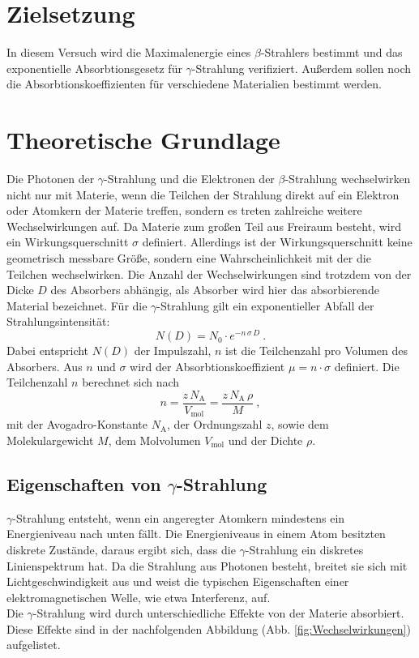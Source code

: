 \section{Zielsetzung}
\label{sec:Zielsetzung}
In diesem Versuch wird die Maximalenergie eines $\beta$-Strahlers bestimmt und das exponentielle Absorbtionsgesetz für $\gamma$-Strahlung verifiziert. Außerdem sollen noch die Absorbtionskoeffizienten für verschiedene Materialien bestimmt werden.

\section{Theoretische Grundlage}
\label{sec:Theorie}
Die Photonen der $\gamma$-Strahlung und die Elektronen der $\beta$-Strahlung wechselwirken nicht nur mit Materie, wenn die Teilchen der Strahlung direkt auf ein Elektron oder Atomkern der Materie treffen, sondern es treten zahlreiche weitere Wechselwirkungen auf. Da Materie zum großen Teil aus Freiraum besteht, wird ein Wirkungsquerschnitt $\sigma$ definiert. Allerdings ist der Wirkungsquerschnitt keine geometrisch messbare Größe, sondern eine Wahrscheinlichkeit mit der die Teilchen wechselwirken. Die Anzahl der Wechselwirkungen sind trotzdem von der Dicke $D$ des Absorbers abhängig, als Absorber wird hier das absorbierende Material bezeichnet. Für die $\gamma$-Strahlung gilt ein exponentieller Abfall der Strahlungsintensität:
\begin{equation}
	N(D) = N_0 \cdot e^{-n\,\sigma\,D} \ .
	\label{eqn:N}
\end{equation}
Dabei entspricht $N(D)$ der Impulszahl, $n$ ist die Teilchenzahl pro Volumen des Absorbers. Aus $n$ und $\sigma$ wird der Absorbtionskoeffizient $\mu = n \cdot \sigma$ definiert. Die Teilchenzahl $n$ berechnet sich nach
\begin{equation}
	n = \frac{z\,N_\text{A}}{V_\text{mol}} = \frac{z\,N_\text{A}\,\rho}{M} \ ,
	\label{eqn:n}
\end{equation}
mit der Avogadro-Konstante $N_\text{A}$, der Ordnungszahl $z$, sowie dem Molekulargewicht $M$, dem Molvolumen $V_\text{mol}$ und der Dichte $\rho$.


\subsection{Eigenschaften von \texorpdfstring{$\gamma$}{}-Strahlung}
$\gamma$-Strahlung entsteht, wenn ein angeregter Atomkern mindestens ein Energieniveau nach unten fällt. Die Energieniveaus in einem Atom besitzten diskrete Zustände, daraus ergibt sich, dass die $\gamma$-Strahlung ein diskretes Linienspektrum hat. Da die Strahlung aus Photonen besteht, breitet sie sich mit Lichtgeschwindigkeit aus und weist die typischen Eigenschaften einer elektromagnetischen Welle, wie etwa Interferenz, auf. \\
Die $\gamma$-Strahlung wird durch unterschiedliche Effekte von der Materie absorbiert. Diese Effekte sind in der nachfolgenden Abbildung (Abb. \eqref{fig:Wechselwirkungen}) aufgelistet.

